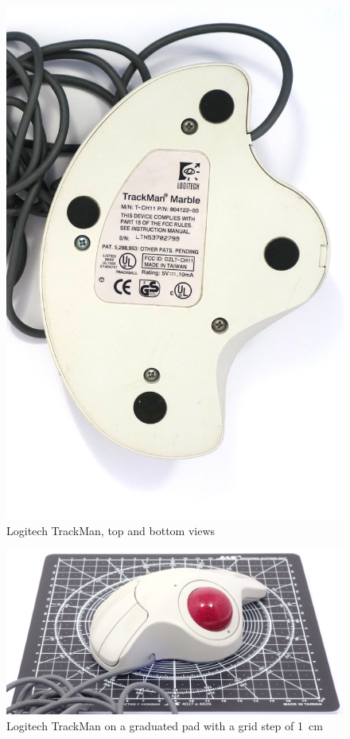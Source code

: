 \documentclass[11pt, a4paper]{article}
\begin{document}
\begin{figure}[h]
    \includegraphics[scale=0.4]{1995_logitech_trackman/bottom_60.jpg}
    \caption{Logitech TrackMan, top and bottom views}
    \label{fig:trackmanTopAndBottom}
\end{figure}

\begin{figure}[h]
    \centering
    \includegraphics[scale=0.4]{1995_logitech_trackman/size_30.jpg}
    \caption{Logitech TrackMan on a graduated pad with a grid step of 1~cm}
    \label{fig:trackmanSize}
\end{figure}
\end{document}
